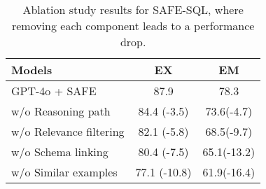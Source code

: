 
\begin{table}[t]
    \centering
    \small
    \begin{tabular}{lcc}
        \toprule
        Models & EX  & EM \\
        \midrule
        GPT-4o + SAFE & 87.9 & 78.3\\ 
        w/o Reasoning path & 84.4 (-3.5) & 73.6(-4.7) \\
        w/o Relevance filtering & 82.1 (-5.8) & 68.5(-9.7) \\
        w/o Schema linking & 80.4 (-7.5)  & 65.1(-13.2)\\
        w/o Similar examples & 77.1 (-10.8) &  61.9(-16.4)\\
        \bottomrule
    \end{tabular}
    \caption{Ablation study results for SAFE-SQL, where removing each component leads to a performance drop.}
    \label{tab:ablation}
    \vspace{-5mm} 
\end{table}

